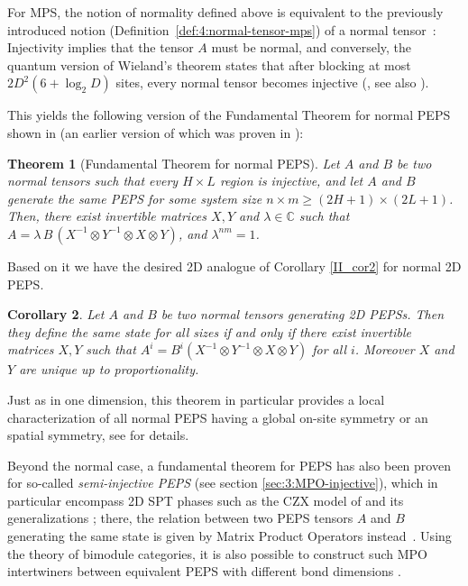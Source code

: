 \documentclass[rmp,aps,reprint,superscriptaddress,nobalancelastpage]{revtex4-1}
\newtheorem{thm}{Theorem}[section]
\newtheorem{cor}[thm]{Corollary}
\begin{document}
For MPS, the notion of normality defined above is equivalent to the previously introduced notion (Definition~\ref{def:4:normal-tensor-mps})
of a normal tensor~\cite{sanz:wielandt}:
Injectivity implies  that the tensor $A$ must be normal, and conversely, the quantum version of Wieland's theorem states that after blocking at most
$2D^2(6+\log_2D)$ sites, every normal tensor becomes injective (\textcite{michalek:wielandt-Dsquare}, see also \textcite{perez-garcia:inj-peps-syms,rahaman:wielandt-Dsquare}).



This yields the following version of the Fundamental Theorem for normal PEPS shown in \textcite{molnar:normal-peps-fundamentalthm} (an earlier version of which was proven in \textcite{perez-garcia:inj-peps-syms}):

\begin{thm}[Fundamental Theorem for normal PEPS]
    \label{thm:canonical-2D}
    Let $A$ and $B$ be two normal tensors such that every $H\times L$ region is injective, and let $A$ and $B$ generate the same PEPS for some system size $n\times m\ge (2H+1)\times (2L+1)$. Then,
    there exist invertible matrices $X,Y$ and $\lambda \in \mathbb{C}$ such that
    $A=\lambda\, B\,(X^{-1}\otimes Y^{-1} \otimes X\otimes Y)$, and $\lambda^{nm}=1$.
\end{thm}

Based on it we have the desired 2D analogue of Corollary \ref{II_cor2} for normal 2D PEPS.

\begin{cor}
    Let $A$ and $B$ be two normal tensors generating 2D PEPSs. Then they define the same state for all sizes if and only if there exist invertible matrices $X,Y$ such that $ A^i= B^i(X^{-1}\otimes Y^{-1} \otimes X\otimes Y)$ for all $i$. Moreover $X$ and $Y$ are unique up to proportionality.
\end{cor}

Just as in one dimension, this theorem in particular provides a local characterization of all normal PEPS having a global on-site symmetry or an spatial symmetry, see \textcite{perez-garcia:inj-peps-syms} for details.

Beyond the normal case, a fundamental theorem for PEPS has also been proven for so-called \emph{semi-injective PEPS} (see section \ref{sec:3:MPO-injective}), which in particular encompass 2D SPT phases such as the CZX model of \textcite{chen:2d-spt-phases-peps-ghz} and its generalizations \cite{chen:spt-order-and-cohomology,williamson:mpo-spt}; there, the relation between two PEPS tensors $A$ and $B$ generating the same state is given by Matrix Product Operators instead~\cite{molnar:quasi-injective-peps}. Using the theory of bimodule categories, it is also possible to construct such MPO intertwiners between equivalent PEPS with different bond dimensions \cite{lootens2020matrix}.
\end{document}
